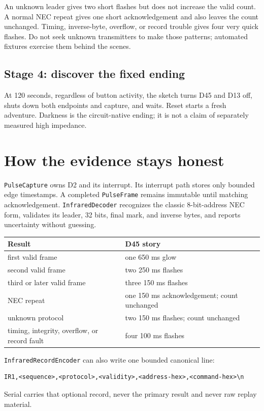 \documentclass[11pt]{article}
\begin{document}
An unknown leader gives two short flashes but does not increase the valid
count. A normal NEC repeat gives one short acknowledgement and also leaves the
count unchanged. Timing, inverse-byte, overflow, or record trouble gives four
very quick flashes. Do not seek unknown transmitters to make those patterns;
automated fixtures exercise them behind the scenes.

\subsection{Stage 4: discover the fixed ending}

At 120 seconds, regardless of button activity, the sketch turns D45 and D13
off, shuts down both endpoints and capture, and waits. Reset starts a fresh
adventure. Darkness is the circuit-native ending; it is not a claim of
separately measured high impedance.

\section{How the evidence stays honest}

\texttt{PulseCapture} owns D2 and its interrupt. Its interrupt path stores only
bounded edge timestamps. A completed \texttt{PulseFrame} remains immutable
until matching acknowledgement. \texttt{InfraredDecoder} recognizes the
classic 8-bit-address NEC form, validates its leader, 32 bits, final mark, and
inverse bytes, and reports uncertainty without guessing.

\begin{tabularx}{\linewidth}{@{}l X@{}}
\toprule
Result & D45 story\\\midrule
first valid frame & one 650 ms glow\\
second valid frame & two 250 ms flashes\\
third or later valid frame & three 150 ms flashes\\
NEC repeat & one 150 ms acknowledgement; count unchanged\\
unknown protocol & two 150 ms flashes; count unchanged\\
timing, integrity, overflow, or record fault & four 100 ms flashes\\
\bottomrule
\end{tabularx}

\texttt{InfraredRecordEncoder} can also write one bounded canonical line:
\begin{verbatim}
IR1,<sequence>,<protocol>,<validity>,<address-hex>,<command-hex>\n
\end{verbatim}
Serial carries that optional record, never the primary result and never raw
replay material.
\end{document}
